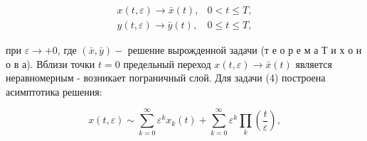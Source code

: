 \documentclass[10pt]{article}
\begin{document}
\[

\begin{array}{ll}

x(t, \varepsilon) \longrightarrow \bar{x}(t), & 0<t \leqslant T, \\

y(t, \varepsilon) \longrightarrow \bar{y}(t), & 0 \leqslant t \leqslant T,

\end{array}

\]



при $\varepsilon \rightarrow+0$, где $(\bar{x}, \bar{y})-$ решение вырожденной задачи (т е о р е м а Т и х о н о в а). Вблизи точки $t=0$ предельный переход $x(t, \varepsilon) \rightarrow \bar{x}(t)$ является неравномерным - возникает пограничный слой. Для задачи (4) построена асимптотика решения:



\[

x(t, \varepsilon) \sim \sum_{k=0}^{\infty} \varepsilon^{k} x_{k}(t)+\sum_{k=0}^{\infty} \varepsilon^{k} \prod_{k}\left(\frac{t}{\varepsilon}\right),

\]
\end{document}
